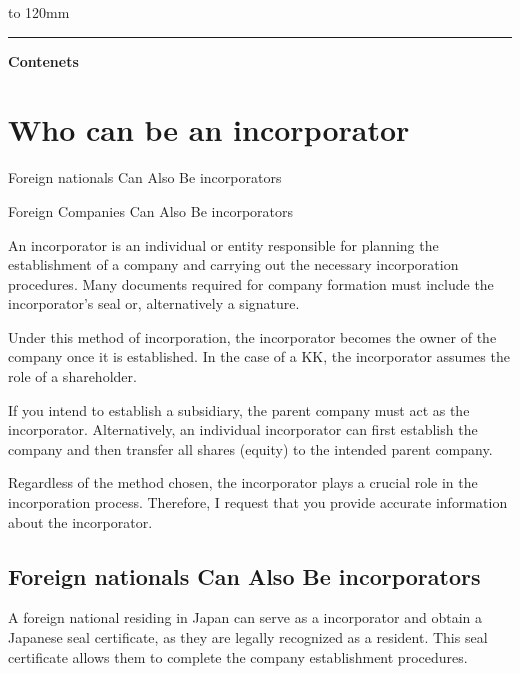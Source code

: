  \renewcommand{\headrulewidth}{11pt}%
 \hbox to 120mm{%
 \color{dominant} \leaders\hrule height11pt\hfil}


\vspace{18mm}
{\color{dominant} \LARGE \bfseries Contenets}
\vspace{-5mm}
\setcounter{tocdepth}{2}
\tableofcontents
\clearpage

\vspace{-20pt}


\section{Who can be an incorporator}

\begin{coloritemize}
\item Foreign nationals Can Also Be incorporators
\item Foreign Companies Can Also Be incorporators
\end{coloritemize}

An incorporator is an individual or entity responsible for planning the establishment of a company and carrying out the necessary incorporation procedures. Many documents required for company formation must include the incorporator's seal or, alternatively a signature.

Under this method of incorporation, the incorporator becomes the owner of the company once it is established. In the case of a KK, the incorporator assumes the role of a shareholder.

If you intend to establish a subsidiary, the parent company must act as the incorporator. Alternatively, an individual incorporator can first establish the company and then transfer all shares (equity) to the intended parent company.

Regardless of the method chosen, the incorporator plays a crucial role in the incorporation process. Therefore, I request that you provide accurate information about the incorporator.

\subsection{Foreign nationals Can Also Be incorporators}
A foreign national residing in Japan can serve as a incorporator and obtain a Japanese seal certificate, as they are legally recognized as a resident. This seal certificate allows them to complete the company establishment procedures.

